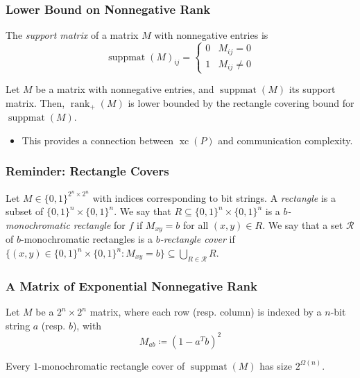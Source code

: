 \documentclass{beamer}
\newcommand{\nrank}{\operatorname{rank}_+}
\newcommand{\bits}{\{0,1\}}
\newcommand{\suppmat}{\operatorname{suppmat}}
\newcommand{\xc}{\operatorname{xc}}
\begin{document}
\begin{frame}
\frametitle{Lower Bound on Nonnegative Rank}

\pause
\begin{definition}
The {\em support matrix} of a matrix $M$ with nonnegative entries is
\[
\suppmat(M)_{ij} = \begin{cases}
0 & M_{ij} = 0 \\
1 & M_{ij} \neq 0
\end{cases}
\]
\end{definition}

\pause
\begin{theorem}[Yannakakis, '91]
Let $M$ be a matrix with nonnegative entries, and $\suppmat(M)$ its support matrix.
Then, $\nrank(M)$ is lower bounded by the rectangle covering bound for $\suppmat(M)$.
\end{theorem}

\pause
\begin{itemize}
\item This provides a connection between $\xc(P)$ and communication complexity.
\end{itemize}

\end{frame}


\begin{frame}
\frametitle{Reminder: Rectangle Covers}

\pause
\begin{definition}
Let $M \in \bits^{2^n \times 2^n}$ with indices corresponding to bit strings. A \emph{rectangle} is a subset of $\bits^n \times \bits^n$. We say that $R \subseteq \bits^n \times \bits^n$ is a \emph{$b$-monochromatic rectangle} for $f$ if $M_{xy} = b$ for all $(x,y) \in R$. We say that a set $\mathcal{R}$ of $b$-monochromatic rectangles is a \emph{$b$-rectangle cover} if $\{(x,y) \in \bits^n \times \bits^n : M_{xy} = b\} \subseteq \bigcup_{R \in \mathcal{R}} R$.
\end{definition}

\end{frame}


\begin{frame}
\frametitle{A Matrix of Exponential Nonnegative Rank}

\pause
\begin{definition}
Let $M$ be a $2^n \times 2^n$ matrix, where each row (resp. column) is indexed by a $n$-bit string $a$ (resp. $b$), with
\[
M_{ab} \coloneqq {\left(1 - a^Tb\right)}^2
\]
\end{definition}

\pause
\begin{theorem}[De Wolf, '03]
Every $1$-monochromatic rectangle cover of $\suppmat(M)$ has size $2^{\Omega(n)}$.
\end{theorem}

\end{frame}
\end{document}
